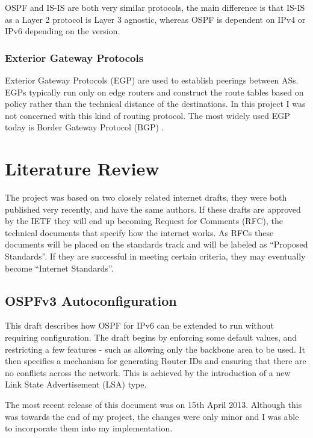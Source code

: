 \documentclass[12pt]{report}
\begin{document}
OSPF and IS-IS are both very similar protocols, the main difference is that
IS-IS as a Layer 2 protocol is Layer 3 agnostic, whereas OSPF is dependent on
IPv4 or IPv6 depending on the version.

\subsection{Exterior Gateway Protocols}
Exterior Gateway Protocols (EGP) 
are used to establish peerings between ASs. EGPs typically run only on edge
routers and construct the route tables based on policy rather than the
technical distance of the destinations. In this project I was not concerned
with this kind of routing protocol.  The most widely used EGP today is Border
Gateway Protocol (BGP) .

\chapter{Literature Review} 
The project was based on two closely related internet drafts, they were both
published very recently, and have the same authors. If these drafts are
approved by the IETF they will end up becoming Request for Comments
(RFC), the technical documents that
specify how the internet works. As RFCs these documents will be placed on the
standards track and will be labeled as ``Proposed Standards''. If they are
successful in meeting certain criteria, they may eventually become ``Internet
Standards''\cite{rfc6410}.

\section{OSPFv3 Autoconfiguration}
This draft\cite{draft-ietf-ospf-ospfv3-autoconfig-02} describes how OSPF for
IPv6 can be extended to run without requiring configuration. The draft begins
by enforcing some default values, and restricting a few features - such as
allowing only the backbone area to be used. It then specifies a mechanism for
generating Router IDs and ensuring that there are no conflicts across the
network. This is achieved by the introduction of a new Link State Advertisement
(LSA)  type. 

The most recent release of this document was on 15th April 2013. Although this
was towards the end of my project, the changes were only minor and I was able
to incorporate them into my implementation.
\end{document}
